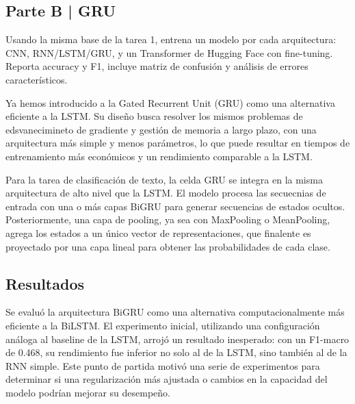 \newpage

\begin{myblock}
\section*{Parte B | GRU}

    Usando la misma base de la tarea 1, entrena un modelo por cada arquitectura: 
    CNN, RNN/LSTM/GRU, y un Transformer de Hugging Face con fine-tuning. Reporta
    accuracy y F1, incluye matriz de confusión y análisis de errores característicos.  

\end{myblock}

Ya hemos introducido a la Gated Recurrent Unit (GRU) como una alternativa eficiente a la LSTM. Su 
diseño busca resolver los mismos problemas de edsvanecimineto de gradiente y gestión de memoria a largo
plazo, con una arquitectura más simple y menos parámetros, lo que puede resultar en tiempos de entrenamiento
más económicos y un rendimiento comparable a la LSTM. 

Para la tarea de clasificación de texto, la celda GRU se integra en la misma arquitectura de alto nivel 
que la LSTM. El modelo procesa las secuecnias de entrada con una o más capas BiGRU para generar 
secuencias de estados ocultos. Posteriormente, una capa de pooling, ya sea con MaxPooling o MeanPooling, 
agrega los estados a un único vector de representaciones, que finalente es proyectado por una capa 
lineal para obtener las probabilidades de cada clase. 

\subsection{Resultados}

Se evaluó la arquitectura BiGRU como una alternativa computacionalmente más eficiente a la BiLSTM. El experimento inicial, utilizando una configuración análoga al baseline de la LSTM, arrojó un resultado inesperado: con un F1-macro de 0.468, su rendimiento fue inferior no solo al de la LSTM, sino también al de la RNN simple. Este punto de partida motivó una serie de experimentos para determinar si una regularización más ajustada o cambios en la capacidad del modelo podrían mejorar su desempeño.

